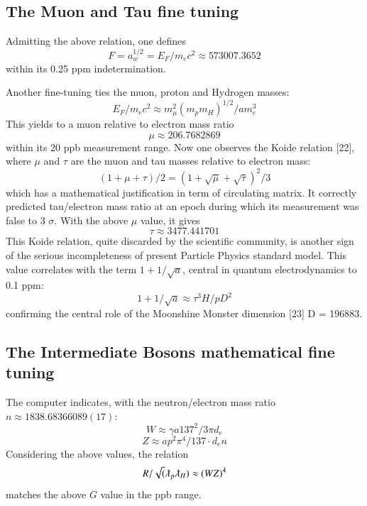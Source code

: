 \documentclass[twoside,draft]{article}
\begin{document}
\begin{sloppypar}
{\subsection {The Muon and Tau fine tuning}

Admitting the above relation, one defines 
\begin{equation} 
F = a_{w}^{1/2} = E_{F} /m_{e} c^{2} \approx 573007.3652
\end{equation}
within its 0.25 ppm indetermination. 

Another fine-tuning ties the muon, proton and Hydrogen masses: 
\begin{equation}
E_{F}/m_{e} c^{2} \approx
m_{\mu}^{2}(m_{p} m_{H})^{1/2}/am_{e}^{3}
\end{equation} 
This yields to a muon relative to electron mass ratio 
\begin{equation}
\mu \approx 206.7682869
\end{equation} within its 20 ppb measurement range.
Now one observes the Koide relation [22], where $\mu$ and $\tau$ are the muon and tau masses relative to electron mass:
\begin{equation}
(1 + \mu + \tau)/2 = (1 + \sqrt\mu + \sqrt\tau)^2/3
\end{equation}
which has a mathematical justification in term of circulating matrix. It correctly predicted tau/electron
mass ratio at an epoch during which its measurement was false to 3 $\sigma$. With the above $\mu$ value, it
gives $$\tau \approx 3477.441701$$ This Koide relation, quite discarded by the scientific community, is another sign of the serious incompleteness of present Particle Physics standard model. This value correlates with the
term $1+1/\sqrt{a}$, central in quantum electrodynamics to 0.1 ppm:
\begin{equation}
1+1/\sqrt{a} \approx \tau^{3} H/pD^{2}
\end{equation}
confirming the central role of the Moonshine Monster dimension [23] D = 196883.

\subsection {The Intermediate Bosons mathematical fine tuning}

The computer indicates, with the neutron/electron mass ratio $n \approx 1838.68366089(17)$:
\begin{equation}
W \approx \gamma a 137^{2} / 3\pi d_{e}
\end{equation}
\begin{equation}
Z \approx ap^{2} \pi^{4} / 137 \cdot d_{e} n
\end{equation}
Considering the above values, the relation
\begin{equation}
R/\sqrt(\lambdabar_{p} \lambdabar_{H} ) \approx (WZ)^{4}
\end{equation}
matches the above $G$ value in the ppb range.

}
\end{sloppypar}
\end{document}
